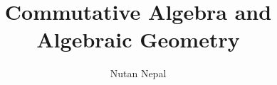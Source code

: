 
\title{Commutative Algebra and Algebraic Geometry}
\author{Nutan Nepal}



    \maketitle
    \section{}
        
        
        
        
